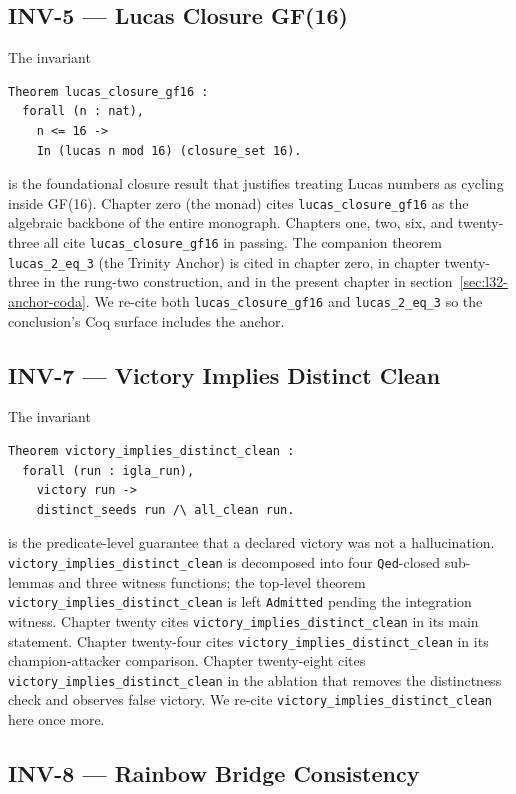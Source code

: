 \subsection{INV-5 --- Lucas Closure GF(16)}

The invariant
\begin{verbatim}
Theorem lucas_closure_gf16 :
  forall (n : nat),
    n <= 16 ->
    In (lucas n mod 16) (closure_set 16).
\end{verbatim}
is the foundational closure result that justifies treating Lucas
numbers as cycling inside GF(16). Chapter zero (the monad) cites
\verb|lucas_closure_gf16| as the algebraic backbone of the entire
monograph. Chapters one, two, six, and twenty-three all cite
\verb|lucas_closure_gf16| in passing. The companion theorem
\verb|lucas_2_eq_3| (the Trinity Anchor) is cited in chapter zero,
in chapter twenty-three in the rung-two construction, and in the
present chapter in section~\ref{sec:l32-anchor-coda}. We re-cite
both \verb|lucas_closure_gf16| and \verb|lucas_2_eq_3| so the
conclusion's Coq surface includes the anchor.

\subsection{INV-7 --- Victory Implies Distinct Clean}

The invariant
\begin{verbatim}
Theorem victory_implies_distinct_clean :
  forall (run : igla_run),
    victory run ->
    distinct_seeds run /\ all_clean run.
\end{verbatim}
is the predicate-level guarantee that a declared victory was not a
hallucination. \verb|victory_implies_distinct_clean| is decomposed
into four \texttt{Qed}-closed sub-lemmas and three witness functions;
the top-level theorem \verb|victory_implies_distinct_clean| is left
\texttt{Admitted} pending the integration witness. Chapter twenty
cites \verb|victory_implies_distinct_clean| in its main statement.
Chapter twenty-four cites \verb|victory_implies_distinct_clean| in
its champion-attacker comparison. Chapter twenty-eight cites
\verb|victory_implies_distinct_clean| in the ablation that removes
the distinctness check and observes false victory. We re-cite
\verb|victory_implies_distinct_clean| here once more.

\subsection{INV-8 --- Rainbow Bridge Consistency}

